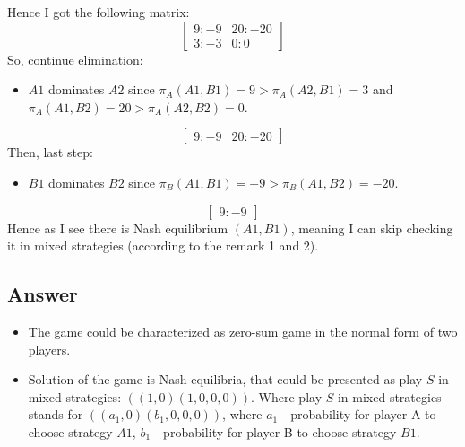 \documentclass[
	a4paper, %
	11pt, %
]{CSUniSchoolLabReport}
\begin{document}
Hence I got the following matrix:
$$
\begin{bmatrix}
    9:-9 & 20:-20 \\
    3:-3 & 0:0
\end{bmatrix}
$$
So, continue elimination:
\begin{itemize}
    \item $A1$ dominates $A2$ since $\pi_A(A1, B1) = 9 > \pi_A(A2, B1) = 3$ and $\pi_A(A1, B2) = 20 > \pi_A(A2, B2) = 0$.
\end{itemize}
$$
\begin{bmatrix}
    9:-9 & 20:-20
\end{bmatrix}
$$
Then, last step:
\begin{itemize}
    \item $B1$ dominates $B2$ since $\pi_B(A1, B1) = -9 > \pi_B(A1, B2) = -20$.
\end{itemize}
$$
\begin{bmatrix}
    9:-9
\end{bmatrix}
$$
Hence as I see there is Nash equilibrium $(A1,B1)$, meaning I can skip checking it in mixed strategies (according to the remark 1 and 2).

\subsection{Answer}\label{answer01}
\begin{itemize}
    \item The game could be characterized as zero-sum game in the normal form of two players.
    \item Solution of the game is Nash equilibria, that could be presented as play $S$ in mixed strategies: $((1, 0)(1, 0, 0, 0))$. Where play $S$ in mixed strategies stands for $((a_1, 0)(b_1, 0, 0, 0))$, where $a_1$ - probability for player A to choose strategy $A1$, $b_1$ - probability for player B to choose strategy $B1$.
\end{itemize}
\end{document}
